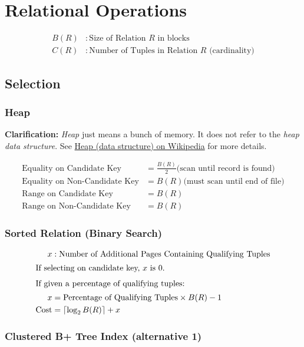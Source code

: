 \documentclass{article}
\newcommand{\ceil}[1]{\left\lceil#1\right\rceil}
\begin{document}
\section{Relational Operations}

\begin{align*}
  B(R) &: \text{Size of Relation \(R\) in blocks} \\
  C(R) &: \text{Number of Tuples in Relation \(R\) (cardinality)}
\end{align*}

\subsection{Selection}

\subsubsection{Heap}

\textbf{Clarification:} \textit{Heap} just means a bunch of memory. It
does not refer to the \textit{heap data structure}. See
\href{http://en.wikipedia.org/wiki/Heap\_(data\_structure)}{Heap (data
  structure) on Wikipedia} for more details.

\begin{align}
  \text{Equality on Candidate Key} &= \frac{B(R)}{2} \text{(scan until record is found)} \\
  \text{Equality on Non-Candidate Key} &= B(R) \text{(must scan until end of file)} \\
  \text{Range on Candidate Key} &= B(R) \\
  \text{Range on Non-Candidate Key} &= B(R)
\end{align}

\subsubsection{Sorted Relation (Binary Search)}

\begin{align}
  x &: \text{Number of Additional Pages Containing Qualifying Tuples} \notag \\
  \intertext{If selecting on candidate key, \(x\) is 0.}
  \intertext{If given a percentage of qualifying tuples:}
  x &= \text{Percentage of Qualifying Tuples} \times B(R) - 1 \\
  \text{Cost} &= \ceil{\log_2B(R)} + x
\end{align}

\subsubsection{Clustered B+ Tree Index (alternative 1)}
\end{document}
